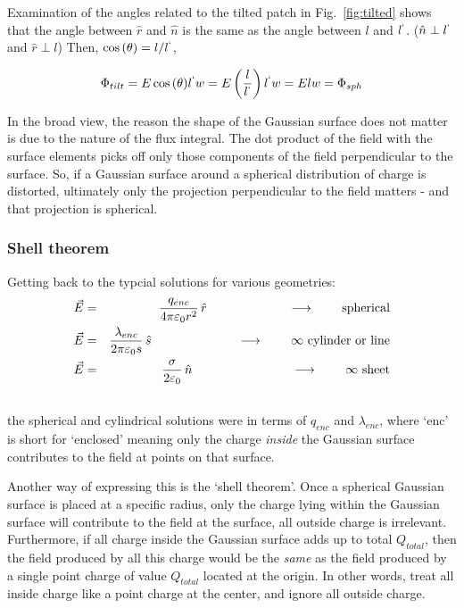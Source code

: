 \documentclass[12pt]{article}
\begin{document}
\begin{flushleft}
Examination of the angles related to the tilted patch in Fig.~\ref{fig:tilted} shows that the angle between $\hat{r}$ and $\hat{n}$ is the same as the angle between $l$ and $l^{`}$.  ($\hat{n} \perp l^{`}$ and $\hat{r} \perp l$)  Then, $\cos{(\theta)}=l/l^{`}$, 

\[
\Phi_{tilt} = E\cos{(\theta)}l^{`}w = E\left( \frac{l}{l^{`}} \right)l^{`}w = Elw = \Phi_{sph}
\]

In the broad view, the reason the shape of the Gaussian surface does not matter is due to the nature of the flux integral.  The dot product of the field with the surface elements picks off only those components of the field perpendicular to the surface.  So, if a Gaussian surface around a spherical distribution of charge is distorted, ultimately only the projection perpendicular to the field matters - and that projection is spherical.

\subsubsection*{\bf Shell theorem}

Getting back to the typcial solutions for various geometries:
\begin{eqnarray}
 \vec{E}  & = & \frac{ q_{enc} }{ 4 \pi \varepsilon_{0} r^{2}} \, \hat{r} \hspace{.9in} \longrightarrow \hspace{.3in} \mbox{spherical} \label{eq:sphere_gauss}\\
\vec{E}  & = & \frac{ \lambda_{enc} }{ 2 \pi \varepsilon_{0} s} \, \hat{s} \hspace{.95in} \longrightarrow \hspace{.3in} \mbox{$\infty$ cylinder or line} \label{eq:cylinder_gauss}\\
 \vec{E}  & = & \frac{ \sigma}{ 2 \varepsilon_{0} } \, \hat{n} \hspace{1.1in} \longrightarrow \hspace{.3in} \mbox{$\infty$ sheet} \label{eq:sheet_gauss}\\
 \nonumber
\end{eqnarray}
the spherical and cylindrical solutions were in terms of $q_{enc}$ and $\lambda_{enc}$, where `enc' is short for `enclosed' meaning only the charge {\it inside} the Gaussian surface contributes to the field at points on that surface.

Another way of expressing this is the `shell theorem'.  Once a spherical Gaussian surface is placed at a specific radius, only the charge lying within the Gaussian surface will contribute to the field at the surface, all outside charge is irrelevant.  Furthermore, if all charge inside the Gaussian surface adds up to total $Q_{total}$, then the field produced by all this charge would be the {\it same} as the field produced by a single point charge of value $Q_{total}$ located at the origin.  In other words, treat all inside charge like a point charge at the center, and ignore all outside charge.


\end{flushleft}
\end{document}
